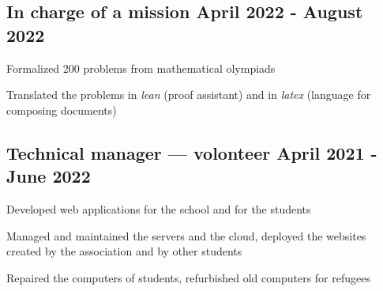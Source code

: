 \subsection{{In charge of a mission \hfill April 2022 - August 2022}}
\begin{zitemize}
    \item Formalized 200 problems from mathematical olympiads
    \item Translated the problems in \textit{lean} (proof assistant) and in \textit{latex} (language for composing documents)
\end{zitemize}
\vspace{0.1cm}

\subsection{{Technical manager --- volonteer \hfill April 2021 - June 2022}}
\begin{zitemize}
    \item Developed web applications for the school and for the students
    \item Managed and maintained the servers and the cloud, deployed the websites created by the association and by other students
    \item Repaired the computers of students, refurbished old computers for refugees
\end{zitemize}
\vspace{0.1cm}
